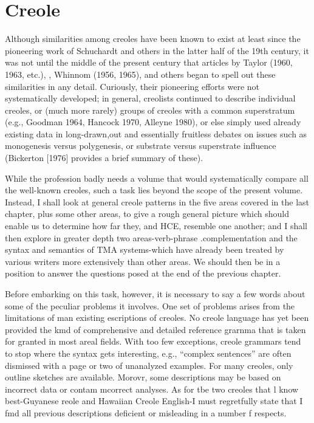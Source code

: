 \chapter{Creole} \label{ch:2}

Although similarities among creoles have been known to exist at least since the pioneering work of Schuchardt and others in the latter half of the 19th century, it was not until the middle of the present century that articles by Taylor (1960, 1963, etc.), \citet{Thompson1961}, Whinnom (1956, 1965), and others began to spell out these similarities in any detail. Curiously, their pioneering efforts were not systematically developed; in general, creolists continued to describe individual creoles, or (much more rarely) groups of creoles with a common superstratum (e.g., Goodman 1964, Hancock 1970, Alleyne 1980), or else simply used already existing data in long-drawn,out and essentially fruitless debates on issues such as monogenesis versus poly\-genesis, or substrate versus superstrate influence (Bickerton [1976] provides a brief summary of these).

While the profession badly needs a volume that would systematically compare all the well-known creoles, such a task lies beyond the scope of the present volume. Instead, I shall look at general creole patterns in the five areas covered in the last chapter, plus some other areas, to give a rough general picture which should enable us to deter\-mine how far they, and HCE, resemble one another; and I shall then
explore in greater depth two areas-verb-phrase .complementation and the syntax and semantics of TMA systems-which have already been treated by various writers more extensively than other areas. We should then be in a position to answer the questions posed at the end of the
previous chapter. 

Before embarking on this task, however, it is necessary to say
a few words about some of the peculiar problems it involves. One set of problems arises from the limitations of man existing escriptions of creoles. No creole language has yet been provided the kmd of com\-prehensive and detailed reference grarnma that is taken for granted in most areal fields. With too few exceptions, creole grammars tend to stop where the syntax gets interesting, e.g., ``complex sentences'' are often dismissed with a page or two of unanalyzed examples. For many creoles, only outline sketches are available. Morovr, some descriptions may be based on incorrect data or contam mcorrect analyses. As for tbe two creoles that l know best-Guyanese reole and Hawaiian Creole English-I must regretfully state that I fmd all previous descriptions deficient or misleading in a number f respects.

